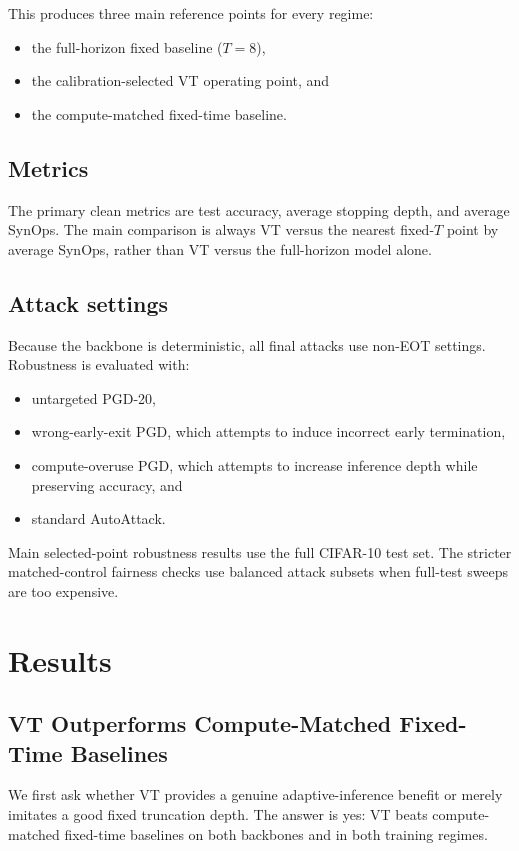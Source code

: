 \documentclass[11pt]{article}
\begin{document}
This produces three main reference points for every regime:
\begin{itemize}[leftmargin=1.3em]
\item the full-horizon fixed baseline ($T=8$),
\item the calibration-selected VT operating point, and
\item the compute-matched fixed-time baseline.
\end{itemize}

\subsection{Metrics}
The primary clean metrics are test accuracy, average stopping depth, and average SynOps. The main comparison is always VT versus the nearest fixed-$T$ point by average SynOps, rather than VT versus the full-horizon model alone.

\subsection{Attack settings}
Because the backbone is deterministic, all final attacks use non-EOT settings. Robustness is evaluated with:
\begin{itemize}[leftmargin=1.3em]
\item untargeted PGD-20,
\item wrong-early-exit PGD, which attempts to induce incorrect early termination,
\item compute-overuse PGD, which attempts to increase inference depth while preserving accuracy, and
\item standard AutoAttack.
\end{itemize}
Main selected-point robustness results use the full CIFAR-10 test set. The stricter matched-control fairness checks use balanced attack subsets when full-test sweeps are too expensive.

\section{Results}
\subsection{VT Outperforms Compute-Matched Fixed-Time Baselines}
We first ask whether VT provides a genuine adaptive-inference benefit or merely imitates a good fixed truncation depth. The answer is yes: VT beats compute-matched fixed-time baselines on both backbones and in both training regimes.
\end{document}
